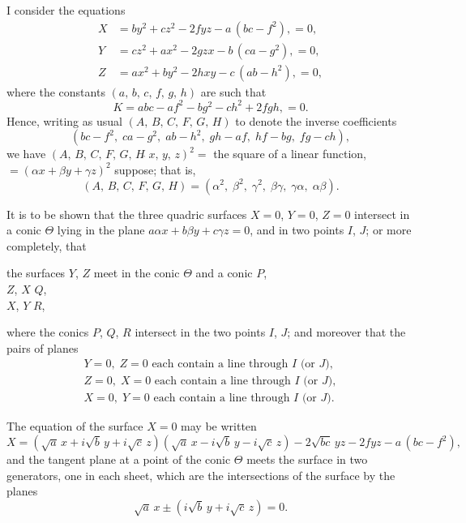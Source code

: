 \documentclass[11pt,a4paper]{book}
\begin{document}
I consider the equations
\begin{align*}
X &= by^2 + cz^2 - 2fyz - a\,(bc-f^2), = 0,\\
Y &= cz^2 + ax^2 - 2gzx - b\,(ca-g^2), = 0,\\
Z &= ax^2 + by^2 - 2hxy - c\,(ab-h^2), = 0,
\end{align*}
where the constants $(a,\, b,\, c,\, f,\, g,\, h)$ are such that
\[
K = abc - af^2 - bg^2 - ch^2 + 2fgh, = 0.
\]
Hence, writing as usual $(A,\, B,\, C,\, F,\, G,\, H)$ to denote the inverse coefficients
\[
(bc-f^2,\; ca-g^2,\; ab-h^2,\; gh-af,\; hf-bg,\; fg-ch),
\]
we have $(A,\, B,\, C,\, F,\, G,\, H\!\!\widehat{\,}\, x,\, y,\, z)^2 =$ the square of a linear function, $= (\alpha x + \beta y + \gamma z)^2$ suppose; that is,
\[
(A,\, B,\, C,\, F,\, G,\, H) = (\alpha^2,\; \beta^2,\; \gamma^2,\; \beta\gamma,\; \gamma\alpha,\; \alpha\beta).
\]

It is to be shown that the three quadric surfaces $X = 0$, $Y = 0$, $Z = 0$ intersect in a conic $\Theta$ lying in the plane $a\alpha x + b\beta y + c\gamma z = 0$, and in two points $I$, $J$; or more completely, that
\begin{center}
the surfaces $Y$, $Z$ meet in the conic $\Theta$ and a conic $P$,\\
\quad\quad\quad $Z$, $X$ \quad\quad\quad\quad\quad\quad\quad\quad\quad\quad\quad\quad\quad\quad\quad $Q$,\\
\quad\quad\quad $X$, $Y$ \quad\quad\quad\quad\quad\quad\quad\quad\quad\quad\quad\quad\quad\quad\quad $R$,
\end{center}
where the conics $P$, $Q$, $R$ intersect in the two points $I$, $J$; and moreover that the pairs of planes
\begin{align*}
Y = 0,\; Z = 0 \text{ each contain a line through } I \text{ (or } J),\\
Z = 0,\; X = 0 \text{ each contain a line through } I \text{ (or } J),\\
X = 0,\; Y = 0 \text{ each contain a line through } I \text{ (or } J).
\end{align*}

The equation of the surface $X = 0$ may be written
\[
X = (\sqrt{a}\,x + i\sqrt{b}\,y + i\sqrt{c}\,z)(\sqrt{a}\,x - i\sqrt{b}\,y - i\sqrt{c}\,z) - 2\sqrt{bc}\,yz - 2fyz - a\,(bc-f^2),
\]
and the tangent plane at a point of the conic $\Theta$ meets the surface in two generators, one in each sheet, which are the intersections of the surface by the planes
\[
\sqrt{a}\,x \pm (i\sqrt{b}\,y + i\sqrt{c}\,z) = 0.
\]
\end{document}
